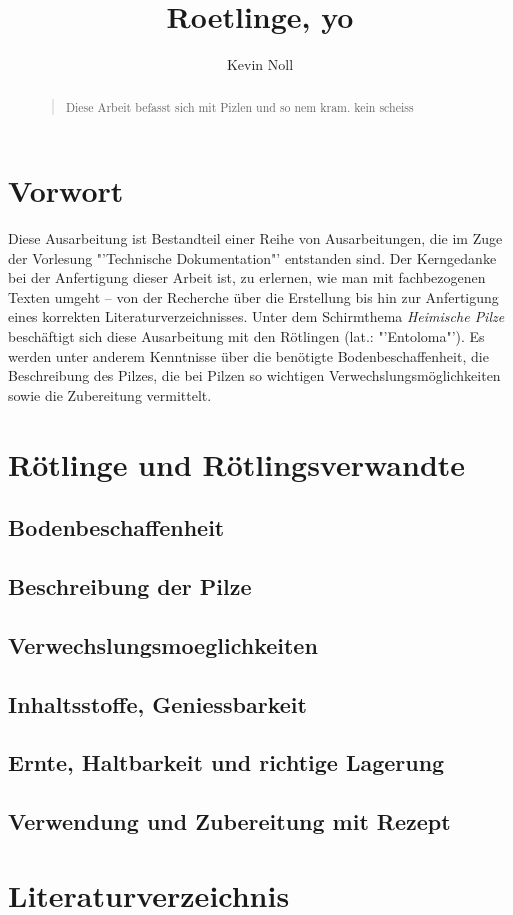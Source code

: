\documentclass[a4paper,abstracton]{scrreprt}
\begin{document}
\author{Kevin Noll}
\subject{Pilze und so}
\title{Roetlinge, yo}
\publishers{htwsaar}
\maketitle
\tableofcontents

\begin{abstract}
\begin{quote}%
Diese Arbeit befasst sich mit Pizlen und so nem kram. kein scheiss
\end{quote} 
\end{abstract}

\chapter{Vorwort}
Diese Ausarbeitung ist Bestandteil einer Reihe von Ausarbeitungen, die im Zuge der Vorlesung "'Technische Dokumentation"' entstanden sind. Der Kerngedanke bei der Anfertigung dieser Arbeit ist, zu erlernen, wie man mit fachbezogenen Texten umgeht -- von der Recherche über die Erstellung bis hin zur Anfertigung eines korrekten Literaturverzeichnisses. Unter dem Schirmthema \emph{Heimische Pilze} beschäftigt sich diese Ausarbeitung mit den Rötlingen (lat.: "'Entoloma"'). Es werden unter anderem Kenntnisse über die benötigte Bodenbeschaffenheit, die Beschreibung des Pilzes, die bei Pilzen so wichtigen Verwechslungsmöglichkeiten sowie die Zubereitung vermittelt.

\chapter{Rötlinge und Rötlingsverwandte}
\section{Bodenbeschaffenheit}
\section{Beschreibung der Pilze}
\section{Verwechslungsmoeglichkeiten}
\section{Inhaltsstoffe, Geniessbarkeit}
\section{Ernte, Haltbarkeit und richtige Lagerung}
\section{Verwendung und Zubereitung mit Rezept}

\chapter{Literaturverzeichnis}
\end{document}
